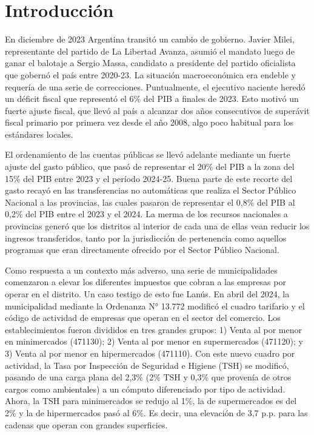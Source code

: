 
\section{Introducción}

En diciembre de 2023 Argentina transitó un cambio de gobierno. Javier Milei, representante del partido de La Libertad Avanza, asumió el mandato luego de ganar el balotaje a Sergio Massa, candidato a presidente del partido oficialista que gobernó el país entre 2020-23. La situación macroeconómica era endeble y requería de una serie de correcciones. Puntualmente, el ejecutivo naciente heredó un déficit fiscal que representó el 6\% del PIB a finales de 2023. Esto motivó un fuerte ajuste fiscal, que llevó al país a alcanzar dos años consecutivos de superávit fiscal primario por primera vez desde el año 2008, algo poco habitual para los estándares locales.

El ordenamiento de las cuentas públicas se llevó adelante mediante un fuerte ajuste del gasto público, que pasó de representar el 20\% del PIB a la zona del 15\% del PIB entre 2023 y el período 2024-25. Buena parte de este recorte del gasto recayó en las transferencias no automáticas que realiza el Sector Público Nacional a las provincias, las cuales pasaron de representar el 0,8\% del PIB al 0,2\% del PIB entre el 2023 y el 2024. La merma de los recursos nacionales a provincias generó que los distritos al interior de cada una de ellas vean reducir los ingresos transferidos, tanto por la jurisdicción de pertenencia como aquellos programas que eran directamente ofrecido por el Sector Público Nacional.

Como respuesta a un contexto más adverso, una serie de municipalidades comenzaron a elevar los diferentes impuestos que cobran a las empresas por operar en el distrito. Un caso testigo de esto fue Lanús. En abril del 2024, la municipalidad mediante la Ordenanza N° 13.772 modificó el cuadro tarifario y el código de actividad de empresas que operan en el sector del comercio. Los establecimientos fueron divididos en tres grandes grupos: 1) Venta al por menor en minimercados (471130); 2) Venta al por menor en supermercados (471120); y 3) Venta al por menor en hipermercados (471110). Con este nuevo cuadro por actividad, la Tasa por Inspección de Seguridad e Higiene (TSH) se modificó, pasando de una carga plana del 2,3\% (2\% TSH y 0,3\% que provenía de otros cargos como ambientales) a un cómputo diferenciado por tipo de actividad. Ahora, la TSH para minimercados se redujo al 1\%, la de supermercados es del 2\% y la de hipermercados pasó al 6\%. Es decir, una elevación de 3,7 p.p. para las cadenas que operan con grandes superficies.

